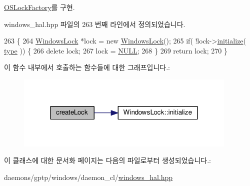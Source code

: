 \hyperlink{class_o_s_lock_factory_ac0789ff714468962f0c1a317d7774585}{O\+S\+Lock\+Factory}를 구현.



windows\+\_\+hal.\+hpp 파일의 263 번째 라인에서 정의되었습니다.


\begin{DoxyCode}
263                                                 \{
264         \hyperlink{class_windows_lock}{WindowsLock} *lock = \textcolor{keyword}{new} \hyperlink{class_windows_lock}{WindowsLock}();
265         \textcolor{keywordflow}{if}( !lock->\hyperlink{class_windows_lock_abe9590069aa14b3a011b299110c7d50f}{initialize}( \hyperlink{namespaceastime__fitline_a7aead736a07eaf25623ad7bfa1f0ee2d}{type} )) \{
266             \textcolor{keyword}{delete} lock;
267             lock = \hyperlink{openavb__types__base__pub_8h_a070d2ce7b6bb7e5c05602aa8c308d0c4}{NULL};
268         \}
269         \textcolor{keywordflow}{return} lock;
270     \}
\end{DoxyCode}


이 함수 내부에서 호출하는 함수들에 대한 그래프입니다.\+:
\nopagebreak
\begin{figure}[H]
\begin{center}
\leavevmode
\includegraphics[width=300pt]{class_windows_lock_factory_ac5b9a10504319d0264f358cf95938c4d_cgraph}
\end{center}
\end{figure}




이 클래스에 대한 문서화 페이지는 다음의 파일로부터 생성되었습니다.\+:\begin{DoxyCompactItemize}
\item 
daemons/gptp/windows/daemon\+\_\+cl/\hyperlink{windows__hal_8hpp}{windows\+\_\+hal.\+hpp}\end{DoxyCompactItemize}
